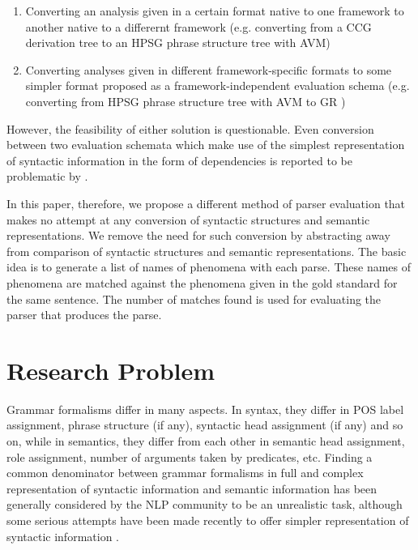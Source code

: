 \documentclass[11pt]{article}
\begin{document}
\begin{enumerate}
\item Converting an analysis given in a certain format native to one framework to another native to a differernt framework (e.g. converting from a CCG \cite{Steedman:00} derivation tree to an HPSG \cite{pollardandsag1994} phrase structure tree with AVM)
\item Converting analyses given in different framework-specific formats to some simpler format proposed as a framework-independent evaluation schema  (e.g. converting from HPSG phrase structure tree with AVM to GR \cite{briscodandcarrollandwatson2006})
\end{enumerate}

However, the feasibility of either solution is questionable. Even conversion between two evaluation schemata which make use of the simplest representation of syntactic information in the form of dependencies is reported to be problematic by \cite{miyaoandsagaeandtsujii2007}. 

In this paper, therefore, we propose a different method of parser evaluation that makes no attempt at any conversion of syntactic structures and semantic representations. We remove the need for such conversion by abstracting away from  comparison of syntactic structures and semantic representations. The basic idea is to generate a list of names of phenomena with each parse. These names of phenomena are matched against the phenomena given in the gold standard for the same sentence. The number of matches found is used for evaluating the parser that produces the parse.

\section{Research Problem}

Grammar formalisms differ in many aspects. In syntax, they differ in POS label assignment, phrase structure (if any), syntactic head assignment (if any) and so on, while in semantics, they differ from each other in semantic head assignment, role assignment, number of arguments taken by predicates, etc. Finding a common denominator between grammar formalisms in full and complex representation of syntactic information and semantic information has been generally considered by the NLP community to be an unrealistic task, although some serious attempts have been made recently to offer simpler representation of syntactic information \cite{briscodandcarrollandwatson2006,demarneffeandmaccartneyandmanning2006}. 
 
\end{document}

